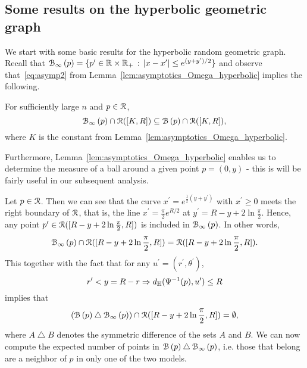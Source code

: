 
\subsection{Some results on the hyperbolic geometric graph}

We start with some basic results for the hyperbolic random geometric graph. Recall that ${\mathcal B}_{\infty}\left(p\right) = \{p^\prime \in {\ensuremath{\mathbb R}} \times {\ensuremath{\mathbb R}}_+ \, : \, |x - x^\prime| \le e^{(y +y^\prime)/2}\}$ and observe that~\eqref{eq:asymp2} from Lemma~\ref{lem:asymptotics_Omega_hyperbolic} implies the following. 
\begin{corollary}\label{cor:balls_inclusion}
For sufficiently large $n$ and $p \in {\mathcal R}$,
\begin{equation*}
 {\mathcal B}_{\infty}\left(p\right) \cap {\mathcal R} ([K,R]) \subseteq {\mathcal B}\left(p\right) \cap {\mathcal R} ([K,R]),
\end{equation*}
where $K$ is the constant from Lemma~\ref{lem:asymptotics_Omega_hyperbolic}.
\end{corollary}


Furthermore, Lemma~\ref{lem:asymptotics_Omega_hyperbolic} enables us to determine the measure of a ball around a given point $p=(0,y)$ - this is will be fairly useful in our subsequent analysis. 

Let $p \in {\mathcal R}$. Then we can see that the curve $x^\prime = e^{\frac{1}{2} (y + y^\prime)}$ with $x^\prime \geq 0$ meets the right boundary of ${\mathcal R}$, that is, the line $x^\prime = \frac{\pi}{2} e^{R/2}$ at $y^\prime = R - y + 2\ln \frac{\pi}{2}$. Hence, any point $p^{\prime} \in {\mathcal R} ([R - y + 2\ln \frac{\pi}{2}, R])$ is included in ${\mathcal B}_{\infty}\left(p\right)$. In other words,
\begin{equation*} \label{eq:P_ball_inclusion_lower}
{\mathcal B}_{\infty}\left(p\right) \cap {\mathcal R} ([R - y +2\ln \frac{\pi}{2},R]) = {\mathcal R} ([R - y + 2\ln \frac{\pi}{2},R]).
\end{equation*}
This together with the fact that for any $u^\prime = (r^\prime, \theta^\prime)$,
\[
	r^\prime < y = R -r \Rightarrow d_{\mathbb{H}}(\Psi^{-1}(p),u^\prime) \le R
\]
implies that 
\begin{equation}\label{eq:symm_diff_upper_P} 
({\mathcal B}\left(p\right) \bigtriangleup {\mathcal B}_{\infty}\left(p\right))  \cap {\mathcal R} ([R - y + 2 \ln \frac{\pi}{2},R]) = \emptyset,
\end{equation}
where $A \bigtriangleup B$ denotes the symmetric difference of the sets $A$ and $B$. We can now compute the expected number of points in ${\mathcal B}\left(p\right) \bigtriangleup {\mathcal B}_{\infty}\left(p\right)$, i.e. those that belong are a neighbor of $p$ in only one of the two models.

